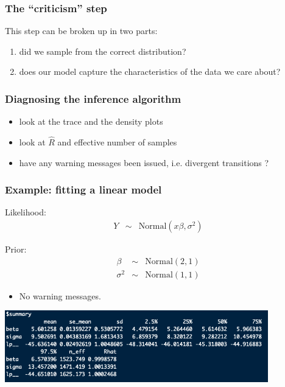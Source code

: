 \documentclass[xcolor=table]{beamer}
\begin{document}
\begin{frame}
  \frametitle{The ``criticism'' step}
  
  This step can be broken up in two parts:
  \begin{enumerate}
    \item did we sample from the correct distribution?
    \item does our model capture the characteristics of the data we care about?
  \end{enumerate}

\end{frame}

\begin{frame}
  \frametitle{Diagnosing the inference algorithm}
  \begin{itemize}
    \item look at the trace and the density plots
    \item look at $\hat R$ and effective number of samples
    \item have any warning messages been issued, i.e. divergent transitions ?
  \end{itemize}

\end{frame}

\begin{frame}
  \frametitle{Example: fitting a linear model}

  Likelihood:
  \begin{eqnarray*}
    Y & \sim & \mathrm{Normal}(x \beta, \sigma^2)
  \end{eqnarray*}

  Prior:
  \begin{eqnarray*}
    \beta & \sim & \mathrm{Normal}(2, 1) \\
    \sigma^2 & \sim & \mathrm{Normal}(1, 1)
  \end{eqnarray*}

\end{frame}

\begin{frame}
  \begin{itemize}
    \item No warning messages.
  \end{itemize}
  \begin{center}
    \includegraphics[width=4.5in]{../figures/linear_summary}
  \end{center}
\end{frame}
\end{document}

